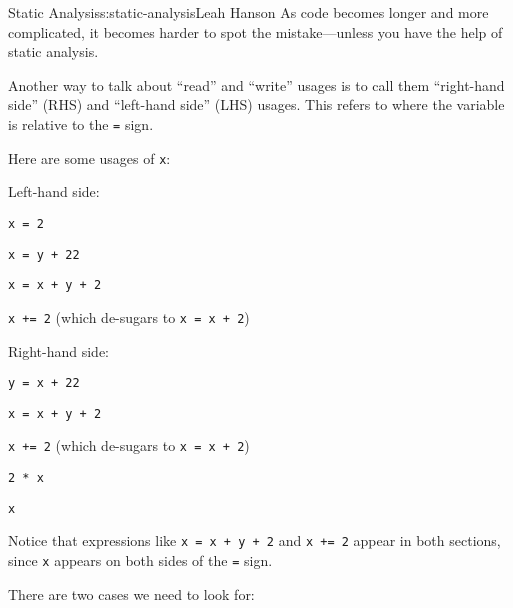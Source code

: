 \begin{aosachapter}{Static Analysis}{s:static-analysis}{Leah Hanson}
As code becomes longer and more complicated, it becomes harder to spot
the mistake---unless you have the help of static analysis.

\label{left-hand-side-and-right-hand-side}

Another way to talk about ``read'' and ``write'' usages is to call them
``right-hand side'' (RHS) and ``left-hand side'' (LHS) usages. This
refers to where the variable is relative to the \texttt{=} sign.

Here are some usages of \texttt{x}:

\begin{aosaitemize}

\item
  Left-hand side:

  \begin{aosaitemize}
  
  \item
    \texttt{x = 2}
  \item
    \texttt{x = y + 22}
  \item
    \texttt{x = x + y + 2}
  \item
    \texttt{x += 2} (which de-sugars to \texttt{x = x + 2})
  \end{aosaitemize}
\item
  Right-hand side:

  \begin{aosaitemize}
  
  \item
    \texttt{y = x + 22}
  \item
    \texttt{x = x + y + 2}
  \item
    \texttt{x += 2} (which de-sugars to \texttt{x = x + 2})
  \item
    \texttt{2 * x}
  \item
    \texttt{x}
  \end{aosaitemize}
\end{aosaitemize}

Notice that expressions like \texttt{x = x + y + 2} and \texttt{x += 2}
appear in both sections, since \texttt{x} appears on both sides of the
\texttt{=} sign.

\label{looking-for-single-use-variables}

There are two cases we need to look for:

\begin{aosaenumerate}
\def\labelenumi{\arabic{enumi}.}


\end{aosaenumerate}
\end{aosachapter}
